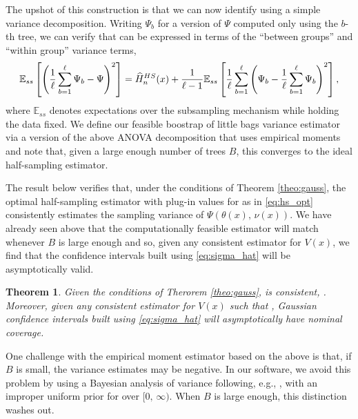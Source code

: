 \documentclass[aos]{imsart}
\theoremstyle{plain}
\newtheorem{theo}[prop]{Theorem}
\theoremstyle{definition}
\theoremstyle{remark}
\begin{document}
\begin{CJK}{UTF8}{gbsn}
{The upshot of this construction is that we can now identify 
using a simple variance decomposition. Writing $\Psi_b$ for a version of $\Psi$
computed only using the $b$-th tree, we can verify that  can
be expressed in terms of the ``between groups'' and ``within group'' variance terms,
\begin{equation*}
\EE[ss]{\p{\frac{1}{\ell} \sum_{b = 1}^\ell \Psi_b - \Psi}^2} = \hH_n^{HS}(x) + \frac{1}{\ell - 1} \EE[ss]{\frac{1}{\ell} \sum_{b = 1}^\ell\p{\Psi_b -\frac{1}{\ell} \sum_{b = 1}^\ell \Psi_b}^2},
\end{equation*}
where $\mathbb{E}_{ss}$ denotes expectations over the subsampling mechanism while
holding the data fixed. We define our feasible boostrap of little bags variance estimator
 via a version of the above ANOVA decomposition that uses empirical moments
and note that, given a large enough number of trees $B$, this converges to the ideal
half-sampling estimator.

The result below verifies that, under the conditions of Theorem \ref{theo:gauss},
the optimal half-sampling estimator 
with plug-in values for  as in \eqref{eq:hs_opt}
consistently estimates the sampling variance of $\Psi(\theta(x), \, \nu(x))$.
We have already seen above that the computationally feasible estimator
 will match  whenever $B$ is large enough and so,
given any consistent estimator  for $V(x)$, we find that the confidence
intervals built using \eqref{eq:sigma_hat} will be asymptotically valid.

\begin{theo}
\label{theo:blb}
Given the conditions of Therorem \ref{theo:gauss},  is consistent,
.
Moreover, given any consistent  estimator for $V(x)$ such that
, Gaussian confidence intervals
built using \eqref{eq:sigma_hat} will asymptotically have nominal coverage.
\end{theo}

One challenge with the empirical moment estimator
based on the above is that, if $B$ is small, the variance estimates
 may be negative. In our software, we avoid this problem
by using a Bayesian analysis of variance following, e.g., \citet{gelman2014bayesian},
with an improper uniform prior for  over $[0, \, \infty)$.
When $B$ is large enough, this distinction washes out.


}
\end{CJK}
\end{document}
